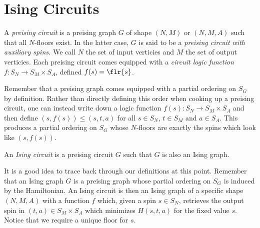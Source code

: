 \newpage

\section{Ising Circuits}
\begin{defn}\label{defn:preising-circuit}
	A \emph{preising circuit} is a preising graph $G$ of shape $(N,M)$ or $(N,M,A)$ such that all $N$-floors exist. In the latter case, $G$ is said to be a \emph{preising circuit with auxiliary spins.} We call $N$ the set of input verticies and $M$ the set of output verticies. Each preising circuit comes equipped with a \emph{circuit logic function} $f:S_N\to S_M\times S_A$, defined $f(s) = \flr{s}$.
\end{defn}
Remember that a preising graph comes equipped with a partial ordering on $S_G$ by definition. Rather than directly defining this order when cooking up a preising circuit, one can instead write down a logic function $f(s):S_N \to S_M\times S_A$ and then define $(s,f(s)) \leq (s,t,a)$ for all $s \in S_N$, $t \in S_M$ and $a \in S_A$. This produces a partial ordering on $S_G$ whose $N$-floors are exactly the spins which look like $(s,f(s))$.

\begin{defn}\label{defn:ising-circuit}
	An \emph{Ising circuit} is a preising circuit $G$ such that $G$ is also an Ising graph.
\end{defn}
\begin{rmk}\label{rmk:ising-circuit-defn}
	It is a good idea to trace back through our definitions at this point. Remember that an Ising graph $G$ is a preising graph whose partial ordering on $S_G$ is induced by the Hamiltonian. An Ising circuit is then an Ising graph of a specific shape $(N,M,A)$ with a function $f$ which, given a spin $s \in S_N$, retrieves the output spin in $(t,a)\in S_M\times S_A$ which minimizes $H(s,t,a)$ for the fixed value $s$. Notice that we require a unique floor for $s$.
\end{rmk}


\printbibliography

